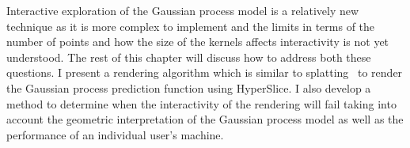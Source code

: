 Interactive 
exploration of the Gaussian process model is a 
relatively new technique as it is more complex to implement and the limits
in terms of the number of points and how the size of the kernels affects 
interactivity is not yet understood.  
The rest of this chapter will discuss how to address both these questions.
I present a rendering algorithm which is similar to 
splatting~\cite{Mueller:1998}
to render the Gaussian
process prediction function using HyperSlice.
I also develop a method to determine when
the interactivity of the rendering will fail taking into account the geometric 
interpretation of the Gaussian process model as well as the performance
of an individual user's machine.

